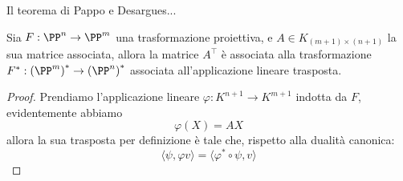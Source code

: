\documentclass[11pt]{scrartcl}
\begin{document}
   	 Il teorema di Pappo e Desargues...
   	 \begin{lemma}
   	 	Sia $F:\PP^n\to \PP^m$ una trasformazione proiettiva, e $A\in K_{(m+1)\times (n+1)}$ la sua matrice associata, allora la matrice $A^\intercal$ è associata alla trasformazione $F^*:\left(\PP^m\right)^*\to\left(\PP^n\right)^*$ associata all'applicazione lineare trasposta.
   	 \end{lemma}
   	 \begin{proof}
   	 	Prendiamo l'applicazione lineare $\varphi:K^{n+1}\to K^{m+1}$ indotta da $F$, evidentemente abbiamo
   	 	$$\varphi(X)=AX$$
   	 	allora la sua trasposta per definizione è tale che, rispetto alla dualità canonica:
   	 	$$\langle \psi,\varphi v\rangle=\langle \varphi^*\circ \psi,v\rangle$$
   	 	
   	 \end{proof}
\end{document}

